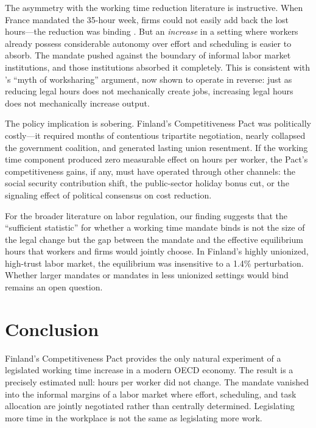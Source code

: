 \documentclass[12pt]{article}
\begin{document}
The asymmetry with the working time reduction literature is instructive. When France mandated the 35-hour week, firms could not easily add back the lost hours---the reduction was binding \citep{estevao2008, crepon2005}. But an \textit{increase} in a setting where workers already possess considerable autonomy over effort and scheduling is easier to absorb. The mandate pushed against the boundary of informal labor market institutions, and those institutions absorbed it completely. This is consistent with \citet{kapteyn2004}'s ``myth of worksharing'' argument, now shown to operate in reverse: just as reducing legal hours does not mechanically create jobs, increasing legal hours does not mechanically increase output.

The policy implication is sobering. Finland's Competitiveness Pact was politically costly---it required months of contentious tripartite negotiation, nearly collapsed the government coalition, and generated lasting union resentment. If the working time component produced zero measurable effect on hours per worker, the Pact's competitiveness gains, if any, must have operated through other channels: the social security contribution shift, the public-sector holiday bonus cut, or the signaling effect of political consensus on cost reduction.

For the broader literature on labor regulation, our finding suggests that the ``sufficient statistic'' for whether a working time mandate binds is not the size of the legal change but the gap between the mandate and the effective equilibrium hours that workers and firms would jointly choose. In Finland's highly unionized, high-trust labor market, the equilibrium was insensitive to a 1.4\% perturbation. Whether larger mandates or mandates in less unionized settings would bind remains an open question.


\section{Conclusion}

Finland's Competitiveness Pact provides the only natural experiment of a legislated working time increase in a modern OECD economy. The result is a precisely estimated null: hours per worker did not change. The mandate vanished into the informal margins of a labor market where effort, scheduling, and task allocation are jointly negotiated rather than centrally determined. Legislating more time in the workplace is not the same as legislating more work.
\end{document}
